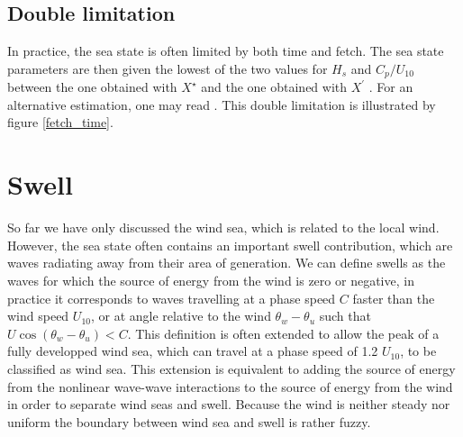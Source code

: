 \subsection{Double limitation}
In practice, the sea state is often limited by both time and fetch. 
The sea state parameters are then given the lowest of the two values for $H_s$ and $C_p/U_{10}$ 
between the one obtained with $X^\star$ and the one obtained with $X^\prime$ \citep[see][]{CERC1977}. 
For an alternative estimation, one may read \cite{Hwang&Wang2004}. This double limitation is illustrated by figure \ref{fetch_time}.



\section{Swell}
So far we have only discussed the wind sea, which is related to the local wind. However,  
the sea state often contains an important swell contribution, which are waves radiating away from their area of generation. We can define swells as the waves for which the source 
of energy from the wind is zero or negative, in practice it corresponds to waves travelling at a phase speed $C$ faster than the wind speed $U_{10}$, or at angle relative 
to the wind $\theta_w - \theta_u$ such that $U \cos(\theta_w-\theta_u) < C$. This definition is often extended to allow the peak of a fully developped wind sea, which can 
travel at a phase speed of 1.2 $U_{10}$, to be classified as wind sea. This extension is equivalent to adding the source of energy from the nonlinear wave-wave interactions to 
the source of energy from the wind in order to separate wind seas and swell. Because the wind is neither steady nor uniform the boundary between wind sea and swell is rather 
fuzzy. 


